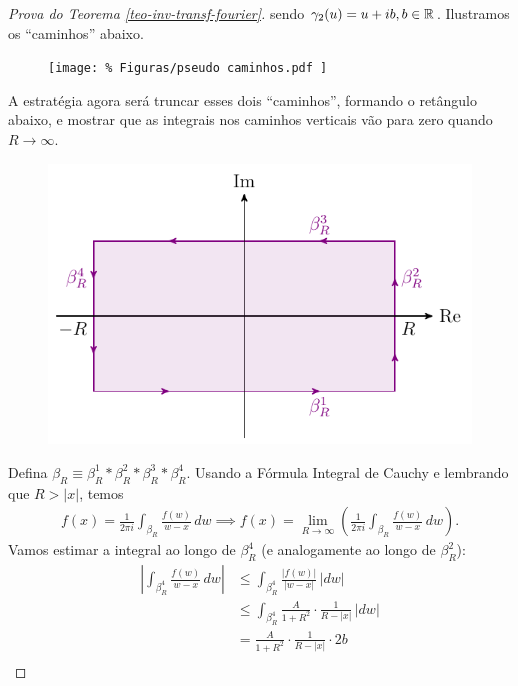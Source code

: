 \begin{proof}[Prova do Teorema \ref{teo-inv-transf-fourier}]
            sendo $\gamma_2(u) = u+ib, b\in\mathbb{R}$. Ilustramos os ``caminhos'' abaixo.
            \begin{figure}[H]\centering 
				\texttt{[image: \%
				    Figuras/pseudo caminhos.pdf
				]}
			\end{figure}
            A estratégia agora será truncar esses dois ``caminhos'', formando o retângulo abaixo, e mostrar que
            as integrais nos caminhos verticais vão para zero quando $R\to\infty$.
            \begin{figure}[H]\centering		            
                \includegraphics{Figuras/beta r.pdf}
			\end{figure}
            Defina $\beta_R \equiv \beta_R^1*\beta_R^2*\beta_R^3*\beta_R^4$. Usando a Fórmula Integral de Cauchy
            e lembrando que $R > |x|$, temos
            \begin{align*}
                f(x) = \frac{1}{2\pi i}\int_{\beta_R} \frac{f(w)}{w-x} \, dw
                \implies f(x) = \lim_{R\to\infty} \left( \frac{1}{2\pi i}\int_{\beta_R} \frac{f(w)}{w-x} \, dw \right).
            \end{align*}
            Vamos estimar a integral ao longo de $\beta_R^4$ (e analogamente ao longo de $\beta_R^2$):
            \begin{align*}
                \left| \int_{\beta_R^4} \frac{f(w)}{w-x} \, dw \right| 
                &\leq \int_{\beta_R^4} \frac{|f(w)|}{|w-x|} \, |dw| \\
                &\leq \int_{\beta_R^4} \frac{A}{1+R^2}\cdot\frac{1}{R-|x|} \, |dw| \\
                &= \frac{A}{1+R^2}\cdot\frac{1}{R-|x|}\cdot 2b \\

\end{align*}
\end{proof}

